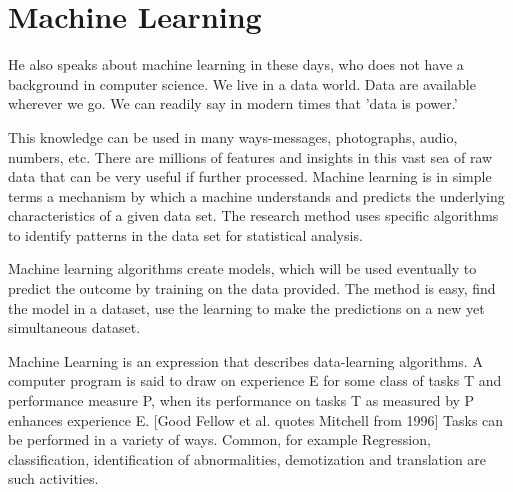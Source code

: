 


\section{Machine Learning}


He also speaks about machine learning in these days, who does not have a background in computer science. We live in a data world. Data are available wherever we go. We can readily say in modern times that 'data is power.'

This knowledge can be used in many ways-messages, photographs, audio, numbers, etc. There are millions of features and insights in this vast sea of raw data that can be very useful if further processed. Machine learning is in simple terms a mechanism by which a machine understands and predicts the underlying characteristics of a given data set. The research method uses specific algorithms to identify patterns in the data set for statistical analysis.

Machine learning algorithms create models, which will be used eventually to predict the outcome by training on the data provided. The method is easy, find the model in a dataset, use the learning to make the predictions on a new yet simultaneous dataset.


Machine Learning is an expression that describes data-learning algorithms.
A computer program is said to draw on experience E for some class of tasks T and performance measure P, when its performance on tasks T as measured by P enhances experience E.  [Good Fellow et al. quotes Mitchell from 1996]
Tasks can be performed in a variety of ways. Common, for example Regression, classification, identification of abnormalities, demotization and translation are such activities.


